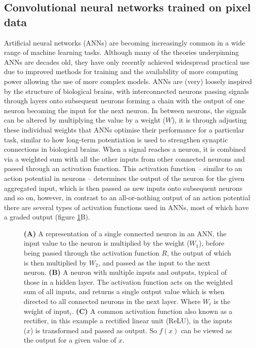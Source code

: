 \documentclass[a4paper,11pt,twoside,openright]{scrbook}
\begin{document}
\subsection{Convolutional neural networks trained on pixel data}
Artificial neural networks (ANNs) are becoming increasingly common in a wide range of machine learning tasks.
Although many of the theories underpinning ANNs are decades old, \cite{Rosenblatt1958} they have only recently achieved widespread practical use due to improved methods for training \cite{Rumelhart1986} and the availability of more computing power allowing the use of more complex models.
ANNs are (very) loosely inspired by the structure of biological brains, with interconnected neurons passing signals through layers onto subsequent neurons forming a chain with the output of one neuron becoming the input for the next neuron.
In between neurons, the signals can be altered by multiplying the value by a weight ($W$), it is through adjusting these individual weights that ANNs optimise their performance for a particular task, similar to how long-term potentiation is used to strengthen synaptic connections in biological brains.
When a signal reaches a neuron, it is combined via a weighted sum with all the other inputs from other connected neurons and passed through an activation function.
This activation function -- similar to an action potential in neurons -- determines the output of the neuron for the given aggregated input, which is then passed as new inputs onto subsequent neurons and so on, however, in contrast to an all-or-nothing output of an action potential there are several types of activation functions used in ANNs, most of which have a graded output (figure \ref{figure:neuron_relu}B).

\begin{figure}
    \captionsetup{width=0.9\textwidth}
    \caption[Diagram neural network neuron and activation function.]{\textbf{(A)} A representation of a single connected neuron in an ANN, the input value to the neuron is multiplied by the weight ($W_1$), before being passed through the activation function $R$, the output of which is then multiplied by $W_2$, and passed as the input to the next neuron. \textbf{(B)} A neuron with multiple inputs and outputs, typical of those in a hidden layer. The activation function acts on the weighted sum of all inputs, and returns a single output value which is when directed to all connected neurons in the next layer. Where $W_i$ is the weight of \textsf{input}$_i$. \textbf{(C)} A common activation function also known as a rectifier, in this example a rectified linear unit (ReLU), in the inputs ($x$) is transformed and passed as output. So $f(x)$ can be viewed as the output for a given value of $x$.}
    \label{figure:neuron_relu}

\end{figure}
\end{document}
